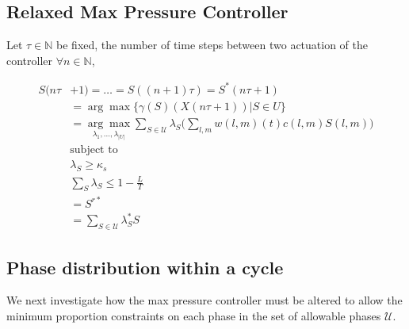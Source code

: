 \subsection*{Relaxed Max Pressure Controller}

Let $\tau \in \mathbb{N}$ be fixed, the number of time steps between two actuation of the controller
$\forall n \in \mathbb{N}$, 

\begin{align} \nonumber
S(n\tau&+1)   = \ldots = S((n+1)\tau ) = S^*(n\tau +1) \\
&=  \arg\max\{\gamma(S)(X(n\tau +1 )) \vert S \in U\}  \\
& =  \underset{\lambda_{1},...,\lambda_{\vert U\vert}}{ \arg \max}  \sum_{S \in \mathcal{U}}\lambda_{S}\Big(\sum_{l,m} w(l,m)(t)c(l,m) S(l,m)\Big)  \\
\nonumber  & \text{subject to}\\
\nonumber  &  \lambda_{S} \geq \kappa_s\\
& \sum_{S} \lambda_{S} \leq 1 - \tfrac{L}{T}  \label{distMP_LP}\\
& = S^{r*} \\
&= \displaystyle\sum_{S \in \mathcal{U}}\lambda_{S}^{*}S
\end{align}

\subsection*{Phase distribution within a cycle}
We next investigate how the max pressure controller must be altered to allow the minimum proportion constraints on each phase in the set of allowable phases $\mathcal U$.

